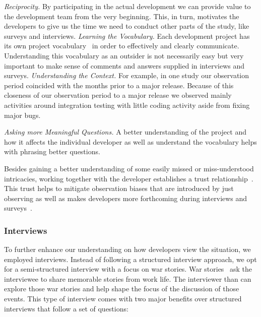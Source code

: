 \emph{Reciprocity.} By participating in the actual development we can provide value to the development team from the very beginning.
This, in turn, motivates the developers to give us the time we need to conduct other parts of the study, like surveys and interviews.
\emph{Learning the Vocabulary.} Each development project has its own project vocabulary~\cite{espinosa2007:team_knowledge} in order to effectively and clearly communicate. 
Understanding this vocabulary as an outsider is not necessarily easy but very important to make sense of comments and answers supplied in interviews and surveys.
\emph{Understanding the Context.} For example, in one study our observation period coincided with the months prior to a major release. 
Because of this closeness of our observation period to a major release we observed mainly activities around integration testing with little coding activity aside from fixing major bugs.


\emph{Asking more Meaningful Questions.} A better understanding of the project and how it affects the individual developer as well as understand the vocabulary helps with phrasing better questions.

Besides gaining a better understanding of some easily missed or miss-understood intricacies, working together with the developer establishes a trust relationship~\cite{letherbridge:ese2005}.
This trust helps to mitigate observation biases that are introduced by just observing as well as makes developers more forthcoming during interviews and surveys~\cite{letherbridge:ese2005}.

\subsubsection{Interviews}
To further enhance our understanding on how developers view the situation, we employed interviews.
Instead of following a structured interview approach, we opt for a semi-structured interview with a focus on war stories.
War stories~\cite{lutters:ist:2007} ask the interviewee to share memorable stories from work life.
The interviewer than can explore those war stories and help shape the focus of the discussion of those events.
This type of interview comes with two major benefits over structured interviews that follow a set of questions:

